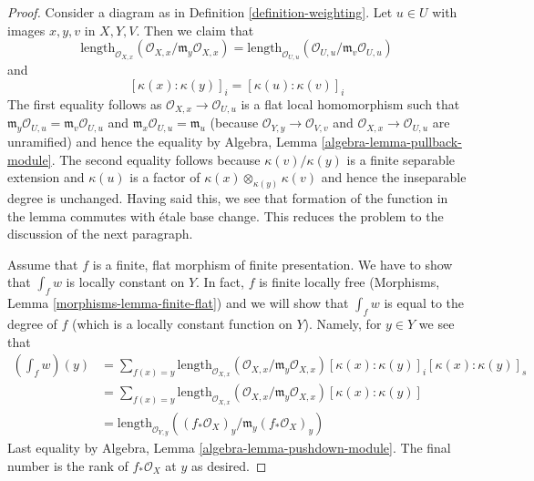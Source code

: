 \documentclass[10pt,a4paper]{amsart}
\theoremstyle{plain}
\theoremstyle{definition}
\theoremstyle{remark}
\numberwithin{equation}{subsection}
\begin{document}
\begin{proof}
Consider a diagram as in Definition \ref{definition-weighting}.
Let $u \in U$ with images $x, y, v$ in $X, Y, V$. Then we claim that
$$
\text{length}_{\mathcal{O}_{X, x}}
(\mathcal{O}_{X, x}/\mathfrak m_y \mathcal{O}_{X, x}) =
\text{length}_{\mathcal{O}_{U, u}}
(\mathcal{O}_{U, u}/\mathfrak m_v \mathcal{O}_{U, u})
$$
and
$$
[\kappa(x) : \kappa(y)]_i =
[\kappa(u) : \kappa(v)]_i
$$
The first equality follows as $\mathcal{O}_{X, x} \to \mathcal{O}_{U, u}$
is a flat local homomorphism such that
$\mathfrak m_y \mathcal{O}_{U, u} = \mathfrak m_v \mathcal{O}_{U, u}$
and $\mathfrak m_x \mathcal{O}_{U, u} = \mathfrak m_u$
(because $\mathcal{O}_{Y, y} \to \mathcal{O}_{V, v}$ and
$\mathcal{O}_{X, x} \to \mathcal{O}_{U, u}$ are unramified)
and hence the equality by Algebra, Lemma \ref{algebra-lemma-pullback-module}.
The second equality follows because $\kappa(v)/\kappa(y)$ is a finite
separable extension and $\kappa(u)$ is a factor of
$\kappa(x) \otimes_{\kappa(y)} \kappa(v)$ and hence the inseparable
degree is unchanged. Having said this, we see that formation
of the function in the lemma commutes with \'etale base change.
This reduces the problem to the discussion of the next paragraph.

\medskip\noindent
Assume that $f$ is a finite, flat morphism of finite presentation.
We have to show that $\int_f w$ is locally constant on $Y$.
In fact, $f$ is finite locally free
(Morphisms, Lemma \ref{morphisms-lemma-finite-flat})
and we will show that $\int_f w$ is equal to the degree of $f$
(which is a locally constant function on $Y$). Namely,
for $y \in Y$ we see that
\begin{align*}
(\textstyle{\int}_f w)(y)
& =
\sum\nolimits_{f(x) = y}
\text{length}_{\mathcal{O}_{X, x}}
(\mathcal{O}_{X, x}/\mathfrak m_y \mathcal{O}_{X, x})
[\kappa(x) : \kappa(y)]_i
[\kappa(x) : \kappa(y)]_s \\
& =
\sum\nolimits_{f(x) = y}
\text{length}_{\mathcal{O}_{X, x}}
(\mathcal{O}_{X, x}/\mathfrak m_y \mathcal{O}_{X, x})
[\kappa(x) : \kappa(y)] \\
& =
\text{length}_{\mathcal{O}_{Y, y}}((f_*\mathcal{O}_X)_y/
\mathfrak m_y (f_*\mathcal{O}_X)_y)
\end{align*}
Last equality by Algebra, Lemma \ref{algebra-lemma-pushdown-module}.
The final number is the rank of $f_*\mathcal{O}_X$ at $y$ as desired.
\end{proof}
\end{document}
